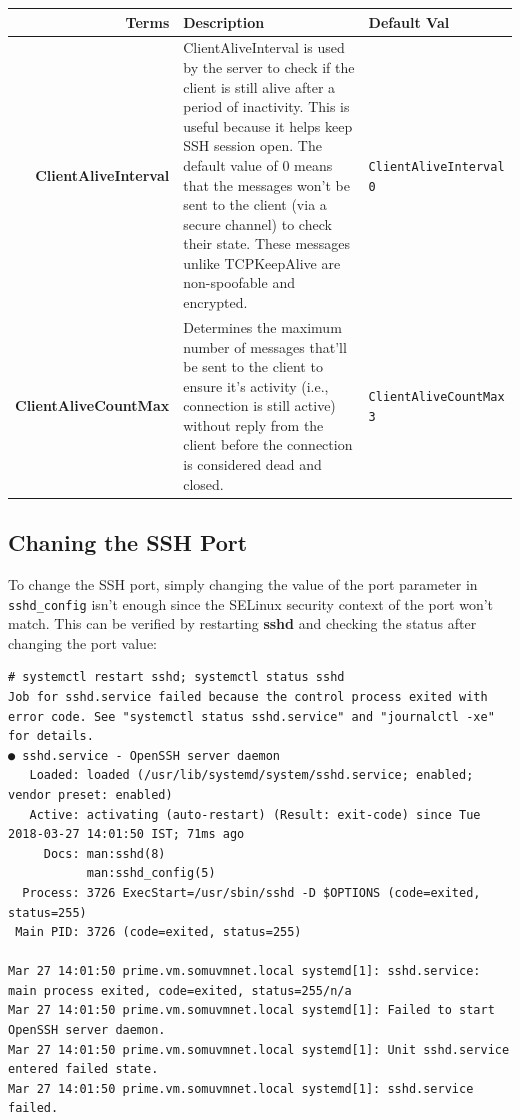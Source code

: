\noindent
\begin{tabular}{rM{0.45}M{0.27}}
	\toprule
	\textbf{Terms} &\textbf{Description} &\textbf{Default Val}\\
	\midrule
	\textbf{ClientAliveInterval} &ClientAliveInterval is used by the server to check if the client is still alive after a period of inactivity. This is useful because it helps keep SSH session open. The default value of 0 means that the messages won't be sent to the client (via a secure channel) to check their state. These messages unlike TCPKeepAlive are non-spoofable and encrypted. &\verb|ClientAliveInterval 0|\\
	\midrule
	\textbf{ClientAliveCountMax} &Determines the maximum number of messages that'll be sent to the client to ensure it's activity (i.e., connection is still active) without reply from the client before the connection is considered dead and closed. &\verb|ClientAliveCountMax 3|\\
	\bottomrule
\end{tabular}

\subsection{Chaning the SSH Port}
To change the SSH port, simply changing the value of the port parameter in \verb|sshd_config| isn't enough since the SELinux security context of the port won't match. This can be verified by restarting \textbf{sshd} and checking the status after changing the port value:

\vspace{-15pt}
\begin{verbatim}
# systemctl restart sshd; systemctl status sshd
Job for sshd.service failed because the control process exited with error code. See "systemctl status sshd.service" and "journalctl -xe" for details.
● sshd.service - OpenSSH server daemon
   Loaded: loaded (/usr/lib/systemd/system/sshd.service; enabled; vendor preset: enabled)
   Active: activating (auto-restart) (Result: exit-code) since Tue 2018-03-27 14:01:50 IST; 71ms ago
     Docs: man:sshd(8)
           man:sshd_config(5)
  Process: 3726 ExecStart=/usr/sbin/sshd -D $OPTIONS (code=exited, status=255)
 Main PID: 3726 (code=exited, status=255)

Mar 27 14:01:50 prime.vm.somuvmnet.local systemd[1]: sshd.service: main process exited, code=exited, status=255/n/a
Mar 27 14:01:50 prime.vm.somuvmnet.local systemd[1]: Failed to start OpenSSH server daemon.
Mar 27 14:01:50 prime.vm.somuvmnet.local systemd[1]: Unit sshd.service entered failed state.
Mar 27 14:01:50 prime.vm.somuvmnet.local systemd[1]: sshd.service failed.
\end{verbatim}
\vspace{-10pt}	

